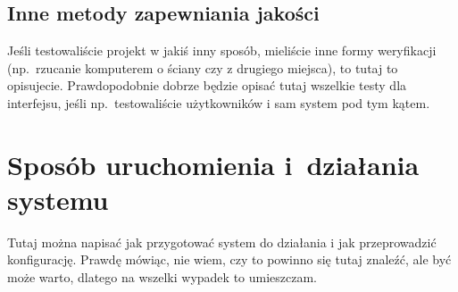 \subsection{Inne metody zapewniania jakości}
\label{Chapter714}

Jeśli testowaliście projekt w jakiś inny sposób, mieliście inne formy weryfikacji (np.~rzucanie komputerem o ściany czy z drugiego miejsca), to tutaj to opisujecie. Prawdopodobnie dobrze będzie opisać tutaj wszelkie testy dla interfejsu, jeśli np.~testowaliście użytkowników i sam system pod tym kątem.

\section{Sposób uruchomienia i~działania systemu}
\label{Chapter72}

Tutaj można napisać jak przygotować system do działania i jak przeprowadzić konfigurację. Prawdę mówiąc, nie wiem, czy to powinno się tutaj znaleźć, ale być może warto, dlatego na wszelki wypadek to umieszczam.
